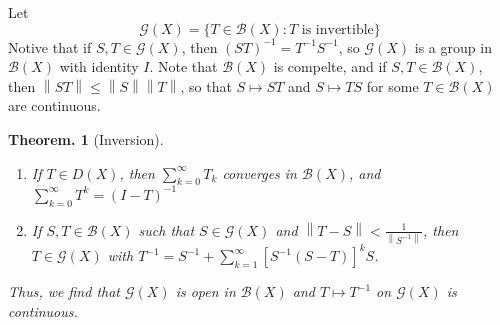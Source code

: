 \documentclass[11pt, a4paper]{memoir}
\newcommand{\norm}[1]{\ensuremath{\left\lVert#1\right\rVert}}
\theoremstyle{change}
\newtheorem{theorem}{Theorem.}[section]
\theoremstyle{plain}
\theoremstyle{nonumberplain}
\numberwithin{equation}{section}
\begin{document}
Let
\begin{equation*}
    \mathcal{G}(X)=\{T\in\mathcal{B}(X):T\text{ is invertible}\}
\end{equation*}
Notive that if $S,T\in\mathcal{G}(X)$, then $(ST)^{-1}=T^{-1}S^{-1}$, so $\mathcal{G}(X)$ is a group in $\mathcal{B}(X)$ with identity $I$.
Note that $\mathcal{B}(X)$ is compelte, and if $S,T\in\mathcal{B}(X)$, then $\norm{ST}\leq\norm{S}\norm{T}$, so that $S\mapsto ST$ and $S\mapsto TS$ for some $T\in\mathcal{B}(X)$ are continuous.
\begin{theorem}[Inversion]
    \begin{enumerate}[nl,r]
        \item If $T\in D(X)$, then $\sum_{k=0}^\infty T_k$ converges in $\mathcal{B}(X)$, and $\sum_{k=0}^\infty T^k=(I-T)^{-1}$
        \item If $S,T\in\mathcal{B}(X)$ such that $S\in\mathcal{G}(X)$ and $\norm{T-S}<\frac{1}{\norm{S^{-1}}}$, then $T\in\mathcal{G}(X)$ with $T^{-1}=S^{-1}+\sum_{k=1}^\infty[S^{-1}(S-T)]^kS$.
    \end{enumerate}
    Thus, we find that $\mathcal{G}(X)$ is open in $\mathcal{B}(X)$ and $T\mapsto T^{-1}$ on $\mathcal{G}(X)$ is continuous.
\end{theorem}
\end{document}
